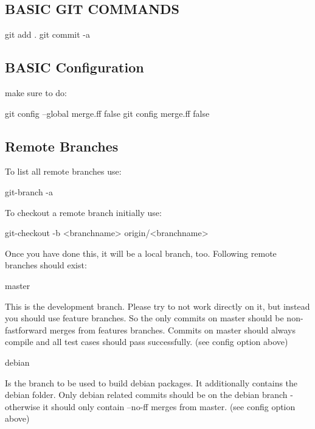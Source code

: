 \subsection*{B\+A\+S\+I\+C G\+I\+T C\+O\+M\+M\+A\+N\+D\+S}

\begin{DoxyVerb}git add .
    git commit -a
\end{DoxyVerb}


\subsection*{B\+A\+S\+I\+C Configuration}

make sure to do\+: \begin{DoxyVerb}    git config --global merge.ff false  
    git config merge.ff false  
\end{DoxyVerb}


\subsection*{Remote Branches}

To list all remote branches use\+: \begin{DoxyVerb}    git-branch -a
\end{DoxyVerb}


To checkout a remote branch initially use\+: \begin{DoxyVerb}    git-checkout -b <branchname> origin/<branchname>
\end{DoxyVerb}


Once you have done this, it will be a local branch, too. Following remote branches should exist\+: \begin{DoxyVerb}    master
\end{DoxyVerb}


This is the development branch. Please try to not work directly on it, but instead you should use feature branches. So the only commits on master should be non-\/fastforward merges from features branches. Commits on master should always compile and all test cases should pass successfully. (see config option above)

\begin{DoxyVerb}    debian
\end{DoxyVerb}


Is the branch to be used to build debian packages. It additionally contains the debian folder. Only debian related commits should be on the debian branch -\/ otherwise it should only contain --no-\/ff merges from master. (see config option above)

